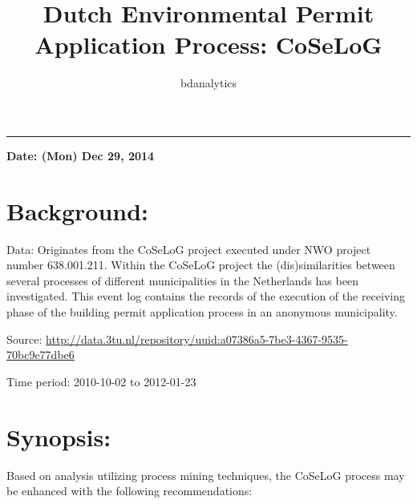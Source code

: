 \documentclass[]{article}
\title{Dutch Environmental Permit Application Process: CoSeLoG}
\author{bdanalytics}
\date{}
\begin{document}
\maketitle


{
\hypersetup{linkcolor=black}
\setcounter{tocdepth}{2}
\tableofcontents
}
\begin{center}\rule{0.5\linewidth}{\linethickness}\end{center}

\textbf{Date: (Mon) Dec 29, 2014}

\section{Background:}\label{background}

Data: Originates from the CoSeLoG project executed under NWO project
number 638.001.211. Within the CoSeLoG project the (dis)similarities
between several processes of different municipalities in the Netherlands
has been investigated. This event log contains the records of the
execution of the receiving phase of the building permit application
process in an anonymous municipality.

Source:
\url{http://data.3tu.nl/repository/uuid:a07386a5-7be3-4367-9535-70bc9e77dbe6}

Time period: 2010-10-02 to 2012-01-23

\section{Synopsis:}\label{synopsis}

Based on analysis utilizing process mining techniques, the CoSeLoG
process may be enhanced with the following recommendations:
\end{document}
